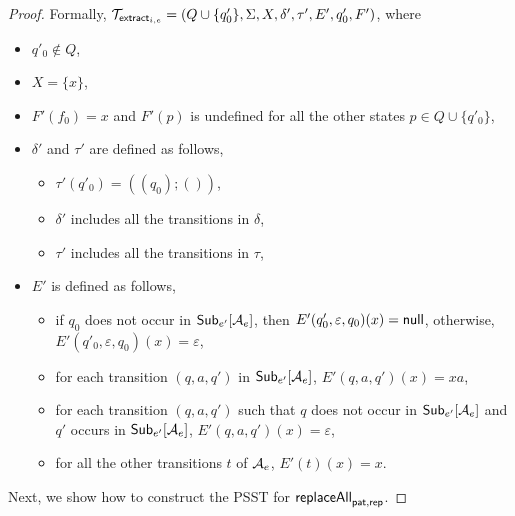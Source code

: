 \begin{proof}
	Formally, $\mathcal{T}_{\mathsf{extract}_{i,e}} = (Q \cup \{q'_0\}, \Sigma, X, \delta', \tau', E', q'_0, F')$, where 
	\begin{itemize}
		\item $q'_0 \not \in Q$,
		\item $X = \{x\}$,
		\item $F'(f_0)= x$ and $F'(p)$ is undefined for all the other states $p \in Q  \cup \{q'_0\}$,
		\item $\delta'$ and $\tau'$ are defined as follows,
		\begin{itemize}
			\item $\tau'(q'_0) = ((q_0); ())$,
			\item $\delta'$ includes all the transitions in $\delta$,
			\item $\tau'$ includes all the transitions in $\tau$,
		\end{itemize}
		\item $E'$ is defined as follows,
		\begin{itemize}
			\item if $q_0$ does not occur in ${\sf Sub}_{e'}[\mathcal{A}_e]$, then $E'(q'_0, \varepsilon, q_0)(x) = \mathsf{null}$, otherwise, $E'(q'_0, \varepsilon, q_0)(x) = \varepsilon$,
			\item for each transition $(q, a, q')$ in ${\sf Sub}_{e'}[\mathcal{A}_e]$, $E'(q, a, q')(x) = x a$,
			\item for each transition $(q, a, q')$ such that $q$ does not occur in ${\sf Sub}_{e'}[\mathcal{A}_e]$ and $q'$ occurs in ${\sf Sub}_{e'}[\mathcal{A}_e]$, $E'(q, a, q')(x) = \varepsilon$,
			\item for all the other transitions $t$ of $\mathcal{A}_e$, $E'(t)(x) = x$.
		\end{itemize}
	\end{itemize}



	Next, we show how to construct the PSST for $\mathsf{replaceAll}_{\mathsf{pat}, \mathsf{rep}}$. 
	

\end{proof}

